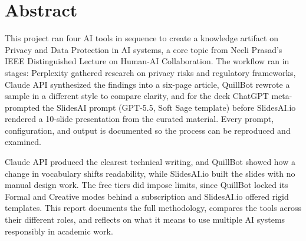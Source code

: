 \section*{Abstract}

This project ran four AI tools in sequence
to create a knowledge artifact on Privacy
and Data Protection in AI systems, a core
topic from Neeli Prasad's IEEE Distinguished
Lecture on Human-AI Collaboration. The
workflow ran in stages: Perplexity gathered
research on privacy risks and regulatory
frameworks, Claude API synthesized the
findings into a six-page article, QuillBot
rewrote a sample in a different style to
compare clarity, and for the deck ChatGPT
meta-prompted the SlidesAI prompt (GPT-5.5,
Soft Sage template) before SlidesAI.io
rendered a 10-slide presentation from the
curated material. Every prompt,
configuration, and output is documented so
the process can be reproduced and examined.

Claude API produced the clearest technical
writing, and QuillBot showed how a change in
vocabulary shifts readability, while
SlidesAI.io built the slides with no manual
design work. The free tiers did impose
limits, since QuillBot locked its Formal and
Creative modes behind a subscription and
SlidesAI.io offered rigid templates. This
report documents the full methodology,
compares the tools across their different
roles, and reflects on what it means to use
multiple AI systems responsibly in academic
work.
